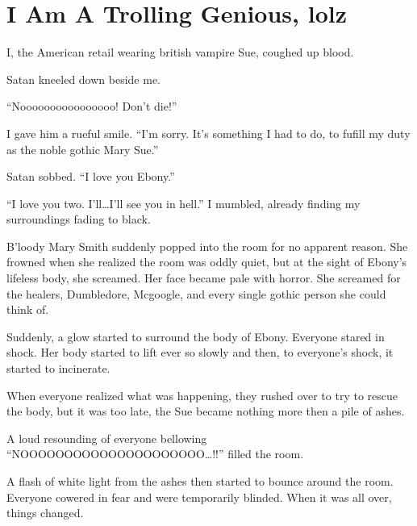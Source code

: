 \section{I Am A Trolling Genious, lolz}



I, the American retail wearing british vampire Sue, coughed up blood.

Satan kneeled down beside me.

\enquote{Noooooooooooooooo! Don't die!}

I gave him a rueful smile. \enquote{I'm sorry. It's something I had to do, to fufill my duty as the noble gothic Mary Sue.}

Satan sobbed. \enquote{I love you Ebony.}

\enquote{I love you two. I'll\ldots I'll see you in hell.} I mumbled, already finding my surroundings fading to black.

B'loody Mary Smith suddenly popped into the room for no apparent reason. She frowned when she realized the room was oddly quiet, but at the sight of Ebony's lifeless body, she screamed. Her face became pale with horror. She screamed for the healers, Dumbledore, Mcgoogle, and every single gothic person she could think of.

Suddenly, a glow started to surround the body of Ebony. Everyone stared in shock. Her body started to lift ever so slowly and then, to everyone's shock, it started to incinerate.

When everyone realized what was happening, they rushed over to try to rescue the body, but it was too late, the Sue became nothing more then a pile of ashes.

A loud resounding of everyone bellowing \enquote{NOOO\-O\-O\-O\-O\-O\-O\-O\-O\-O\-O\-O\-O\-O\-OOOOO\ldots!!} filled the room.

A flash of white light from the ashes then started to bounce around the room. Everyone cowered in fear and were temporarily blinded. When it was all over, things changed.

